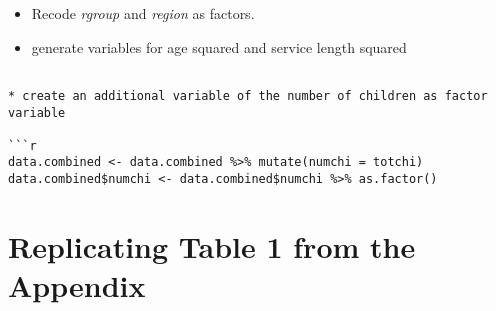 \documentclass[
]{article}
\newenvironment{Shaded}{\begin{snugshade}}{\end{snugshade}}
\newcommand{\DataTypeTok}[1]{\textcolor[rgb]{0.13,0.29,0.53}{#1}}
\newcommand{\DecValTok}[1]{\textcolor[rgb]{0.00,0.00,0.81}{#1}}
\newcommand{\KeywordTok}[1]{\textcolor[rgb]{0.13,0.29,0.53}{\textbf{#1}}}
\newcommand{\NormalTok}[1]{#1}
\newcommand{\OperatorTok}[1]{\textcolor[rgb]{0.81,0.36,0.00}{\textbf{#1}}}
\newcommand{\StringTok}[1]{\textcolor[rgb]{0.31,0.60,0.02}{#1}}
\providecommand{\tightlist}{%
  \setlength{\itemsep}{0pt}\setlength{\parskip}{0pt}}
\begin{document}
\begin{itemize}
\tightlist
\item
  Recode \emph{rgroup} and \emph{region} as factors.
\end{itemize}

\begin{Shaded}
\end{Shaded}

\begin{itemize}
\tightlist
\item
  generate variables for age squared and service length squared
\end{itemize}

\begin{Shaded}
\end{Shaded}

\begin{verbatim}

* create an additional variable of the number of children as factor variable

```r
data.combined <- data.combined %>% mutate(numchi = totchi)
data.combined$numchi <- data.combined$numchi %>% as.factor()
\end{verbatim}

\hypertarget{replicating-table-1-from-the-appendix}{%
\section{Replicating Table 1 from the
Appendix}\label{replicating-table-1-from-the-appendix}}
\end{document}

